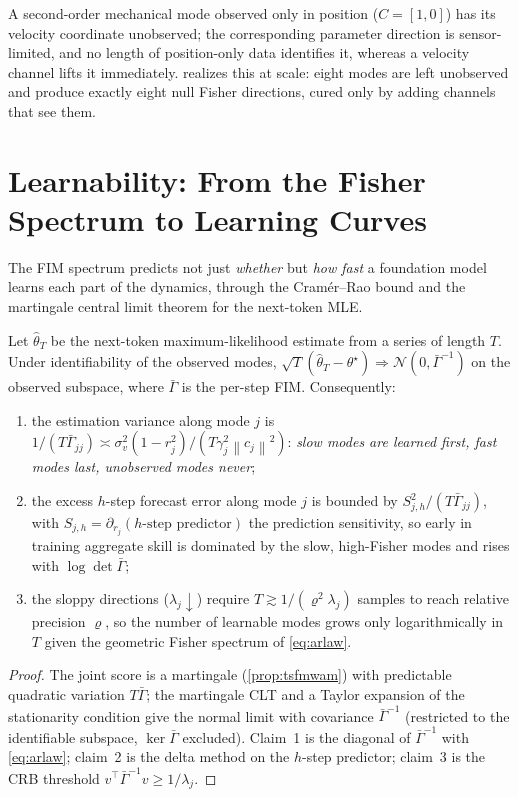 \documentclass[10pt]{article}
\theoremstyle{plain}
\theoremstyle{definition}
\theoremstyle{remark}
\newcommand{\Gam}{\Gamma}
\newcommand{\norm}[1]{\left\lVert #1 \right\rVert}
\begin{document}
\begin{example}
A second-order mechanical mode observed only in position ($C=[1,0]$) has its
velocity coordinate unobserved; the corresponding parameter direction is
sensor-limited, and no length of position-only data identifies it, whereas a
velocity channel lifts it immediately.  realizes this at
scale: eight modes are left unobserved and produce exactly eight null Fisher
directions, cured only by adding channels that see them.
\end{example}

\section{Learnability: From the Fisher Spectrum to Learning Curves}
\label{sec:learn}

The FIM spectrum predicts not just \emph{whether} but \emph{how fast} a
foundation model learns each part of the dynamics, through the Cram\'er--Rao
bound and the martingale central limit theorem for the next-token MLE.

\begin{proposition}\label{prop:learn}
Let $\hat\theta_T$ be the next-token maximum-likelihood estimate from a series of
length $T$. Under identifiability of the observed modes,
$\sqrt{T}(\hat\theta_T-\theta^\star)\Rightarrow\mathcal N(0,\bar\Gam^{-1})$ on the
observed subspace, where $\bar\Gam$ is the per-step FIM. Consequently:
\begin{enumerate}[leftmargin=1.7em,itemsep=1pt]
\item the estimation variance along mode $j$ is $1/(T\bar\Gam_{jj})\asymp
\sigma_v^2(1-r_j^2)/(T\gamma_j^2\norm{c_j}^2)$: \emph{slow modes are learned
first, fast modes last, unobserved modes never};
\item the excess $h$-step forecast error along mode $j$ is bounded by
$S_{j,h}^2/(T\bar\Gam_{jj})$, with $S_{j,h}=\partial_{r_j}(\text{$h$-step
predictor})$ the prediction sensitivity, so early in training aggregate skill is
dominated by the slow, high-Fisher modes and rises with $\log\det\bar\Gam$;
\item the sloppy directions ($\lambda_j\!\downarrow$) require
$T\gtrsim1/(\varrho^2\lambda_j)$ samples to reach relative precision $\varrho$,
so the number of learnable modes grows only logarithmically in $T$ given the
geometric Fisher spectrum of \eqref{eq:arlaw}.
\end{enumerate}
\end{proposition}
\begin{proof}
The joint score is a martingale (\cref{prop:tsfmwam}) with predictable quadratic
variation $T\bar\Gam$; the martingale CLT and a Taylor expansion of the
stationarity condition give the normal limit with covariance $\bar\Gam^{-1}$
(restricted to the identifiable subspace, $\ker\bar\Gam$ excluded). Claim~1 is the
diagonal of $\bar\Gam^{-1}$ with \eqref{eq:arlaw}; claim~2 is the delta method on
the $h$-step predictor; claim~3 is the CRB threshold $v^\top\bar\Gam^{-1}v\ge
1/\lambda_j$.
\end{proof}
\end{document}
